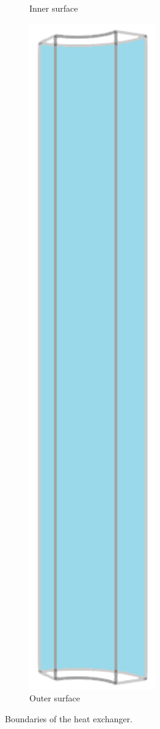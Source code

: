 \begin{figure}[!htb]
\begin{subfigure}{0.19\textwidth}
    \caption{Inner surface}
  \end{subfigure}
  \begin{subfigure}{0.19\textwidth}
    \centering
    \includegraphics[width=0.6\textwidth]{Chapter5/figures/spallation/geometry_outer}
    \caption{Outer surface}
  \end{subfigure}
  \caption{Boundaries of the heat exchanger.}
  \label{fig: Chapter5/spallation/boundaries}
\end{figure}
